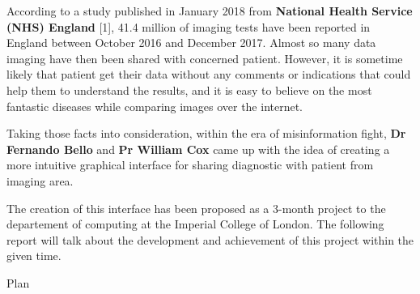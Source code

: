 According to a study published in January 2018 from \textbf{National Health Service (NHS) England} [1], 41.4 million of imaging tests have been reported in England between October 2016 and December 2017. Almost so many data imaging have then been shared with concerned patient. However, it is sometime likely that patient get their data without any comments or indications that could help them to understand the results, and it is easy to believe on the most fantastic diseases while comparing images over the internet. 

\newline \vspace{5mm}
Taking those facts into consideration, within the era of misinformation fight, \textbf{Dr Fernando Bello} and \textbf{Pr William Cox} came up with the idea of creating a more intuitive graphical interface for sharing diagnostic with patient from imaging area.


\newline \vspace{5mm}
The creation of this interface has been proposed as a 3-month project to the departement of computing at the Imperial College of London. The following report will talk about the development and achievement of this project within the given time.  


\newline \vspace{5mm}
Plan




 





